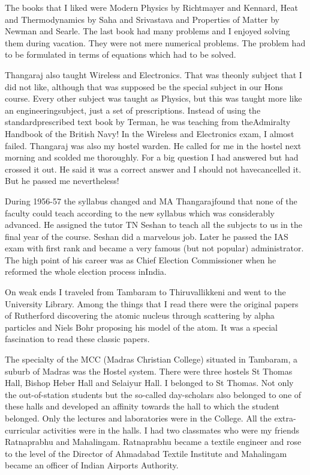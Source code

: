 The books that I liked were Modern Physics by Richtmayer and Kennard, 
Heat and Thermodynamics by Saha and Srivastava and Properties of Matter 
by Newman and Searle. The last book had many problems and I enjoyed 
solving them during vacation. They were not mere numerical problems. The 
problem had to be formulated in terms of equations which had to be 
solved.

Thangaraj also taught Wireless and Electronics. That was the\break only 
subject that I did not like, although that was supposed be the special 
subject in our Hons course. Every other subject was taught as Physics, 
but this was taught more like an engineering\break subject, just a set of 
prescriptions. Instead of using the standard\break prescribed text book by 
Terman, he was teaching from the\break Admiralty Handbook of the British Navy! 
In the Wireless and Electronics exam, I almost failed. Thangaraj was 
also my hostel warden. He called for me in the hostel next morning and 
scolded me thoroughly. For a big question I had answered but had crossed 
it out. He said it was a correct answer and I should not have\break cancelled 
it. But he passed me nevertheless!

During 1956-57 the syllabus changed and MA Thangaraj\break found that none of 
the faculty could teach according to the new syllabus which was 
considerably advanced. He assigned the tutor TN Seshan to teach all the 
subjects to us in the final year of the course. Seshan did a marvelous 
job. Later he passed the IAS exam with first rank and became a very 
famous (but not popular) administrator. The high point of his career was 
as Chief Election\- Commissioner when he reformed the whole election 
process in\break India.

On weak ends I traveled from Tambaram to Thiruvallikkeni and went to 
the University Library. Among the things that I read there were the 
original papers of Rutherford discovering the atomic nucleus through 
scattering by alpha particles and Niels Bohr proposing his model of the 
atom. It was a special fascination to read these classic papers.
 
The specialty of the MCC (Madras Christian College) situated in 
Tambaram, a suburb of Madras was the Hostel system. There were three 
hostels St Thomas Hall, Bishop Heber Hall and Selaiyur Hall. I belonged 
to St Thomas. Not only the out-of-station students but the so-called 
day-scholars also belonged to one of these halls and developed an 
affinity towards the hall to which the student belonged. Only the 
lectures and laboratories were in the College. All the extra-curricular 
activities were in the halls. I had two classmates who were my friends 
Ratnaprabhu and Mahalingam. Ratnaprabhu became a textile engineer and 
rose to the level of the Director of Ahmadabad Textile Institute and 
Mahalingam became an officer of Indian Airports Authority.

